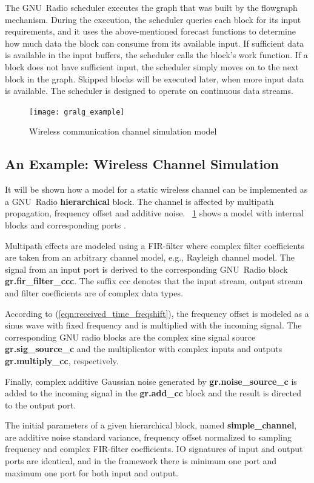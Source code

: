 The GNU~Radio scheduler executes the graph that was built by the flowgraph mechanism. During the execution, the scheduler queries each block for its input requirements, and it uses the above-mentioned forecast functions to determine how much data the block can consume from its available input. If sufficient data is available in the input buffers, the scheduler calls the block's work function. If a block does not have sufficient input, the scheduler simply moves on to the next block in the graph. Skipped blocks will be executed later, when more input data is available. The scheduler is designed to operate on continuous data streams.
%
\begin{figure}[thb]
\centering
\texttt{[image: gralg\_example]}
\caption{Wireless communication channel simulation model}\label{fig:gralg_example}
\end{figure}

\subsection{An Example: Wireless Channel Simulation}

It will be shown how a model for a static wireless channel can be implemented as a GNU~Radio \textbf{hierarchical} block. The channel is affected by multipath propagation, frequency offset and additive noise. ~\cref{fig:gralg_example} shows a model with internal blocks and corresponding ports \cite{Auras}.

Multipath effects are modeled using a FIR-filter where complex filter coefficients are taken from an arbitrary channel model, e.g., Rayleigh channel model. The signal from an input port is derived to the corresponding GNU~Radio block \textbf{gr.fir\_filter\_ccc}. The suffix ccc denotes that the input stream, output stream and filter coefficients are of complex data types.

According to (\ref{eqn:received_time_freqshift}), the frequency offset is modeled as a sinus wave with fixed frequency and is multiplied with the incoming signal. The corresponding GNU radio blocks are the complex sine signal source \textbf{gr.sig\_source\_c} and the multiplicator with complex inputs and outputs \textbf{gr.multiply\_cc}, respectively.

Finally, complex additive Gaussian noise generated by \textbf{gr.noise\_source\_c} is added to the incoming signal in the \textbf{gr.add\_cc} block and the result is directed to the output port.

The initial parameters of a given hierarchical block, named \textbf{simple\_channel}, are additive noise standard variance, frequency offset normalized to sampling frequency and complex FIR-filter coefficients. IO signatures of input and output ports are identical, and in the framework there is minimum one port and maximum one port for both input and output.

